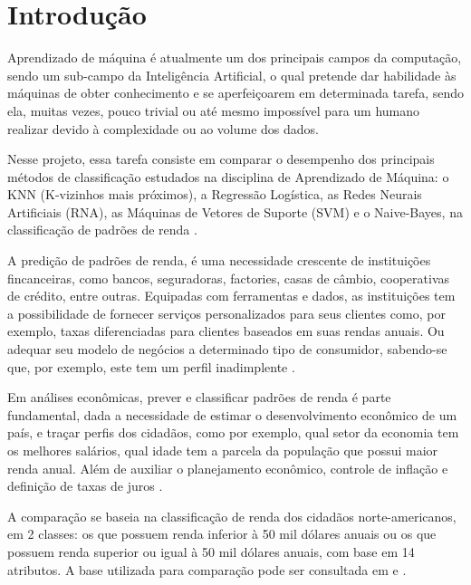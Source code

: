 \section{Introdução}
Aprendizado de máquina é atualmente um dos principais campos da computação, sendo um sub-campo da Inteligência Artificial, o qual pretende dar habilidade às máquinas de obter conhecimento e se aperfeiçoarem em determinada tarefa, sendo ela, muitas vezes, pouco trivial ou até mesmo impossível para um humano realizar devido à complexidade ou ao volume dos dados.

Nesse projeto, essa tarefa consiste em comparar o desempenho dos principais métodos de classificação estudados na disciplina de Aprendizado de Máquina: o KNN (K-vizinhos mais próximos), a Regressão Logística, as Redes Neurais Artificiais (RNA), as Máquinas de Vetores de Suporte (SVM) e o Naive-Bayes, na classificação de padrões de renda \cite{trabalho}.

A predição de padrões de renda, é uma necessidade crescente de instituições fincanceiras, como bancos, seguradoras, factories, casas de câmbio, cooperativas de crédito, entre outras. Equipadas com ferramentas e dados, as instituições tem a possibilidade de fornecer serviços personalizados para seus clientes como, por exemplo, taxas diferenciadas para clientes baseados em suas rendas anuais. Ou adequar seu modelo de negócios a determinado tipo de consumidor, sabendo-se que, por exemplo, este tem um perfil inadimplente \cite{importance}.

Em análises econômicas, prever e classificar padrões de renda é parte fundamental, dada a necessidade de estimar o desenvolvimento econômico de um país, e traçar perfis dos cidadãos, como por exemplo, qual setor da economia tem os melhores salários, qual idade tem a parcela da população que possui maior renda anual. Além de auxiliar o planejamento econômico, controle de inflação e definição de taxas de juros \cite{importance2}.

A comparação se baseia na classificação de renda dos cidadãos norte-americanos, em 2 classes: os que possuem renda inferior à 50 mil dólares anuais ou os que possuem renda superior ou igual à 50 mil dólares anuais, com base em 14 atributos. A base utilizada para comparação pode ser consultada em \cite{base} e \cite{base2}.